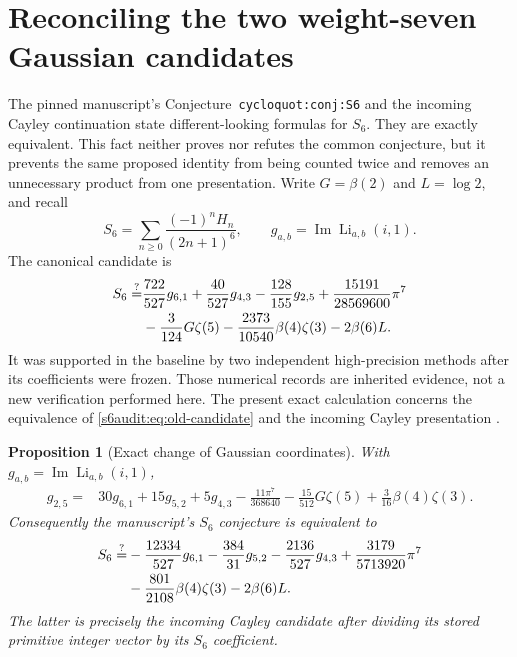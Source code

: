 \documentclass[11pt,a4paper]{article}
\numberwithin{equation}{section}
\theoremstyle{plain}
\newtheorem{proposition}[theorem]{Proposition}
\theoremstyle{definition}
\theoremstyle{remark}
\begin{document}
\section{Reconciling the two weight-seven Gaussian candidates}
\label{s6audit:sec:main}

The pinned manuscript's Conjecture~\texttt{cycloquot:conj:S6} and the
incoming Cayley continuation state different-looking formulas for $S_6$.
They are exactly equivalent. This fact neither proves nor refutes the
common conjecture, but it prevents the same proposed identity from being
counted twice and removes an unnecessary product from one presentation.
Write $G=\beta(2)$ and $L=\log2$, and recall
\[
 S_6=\sum_{n\ge0}\frac{(-1)^nH_n}{(2n+1)^6},
 \qquad g_{a,b}=\operatorname{Im}\operatorname{Li}_{a,b}(i,1).
\]
The canonical candidate is
\begin{align}
 S_6\stackrel{?}{=}&\frac{722}{527}g_{6,1}
 +\frac{40}{527}g_{4,3}-\frac{128}{155}g_{2,5}
 +\frac{15191}{28569600}\pi^7\notag\\
 &-\frac3{124}G\zeta(5)-\frac{2373}{10540}\beta(4)\zeta(3)
 -2\beta(6)L.\label{s6audit:eq:old-candidate}
\end{align}
It was supported in the baseline by two independent high-precision
methods after its coefficients were frozen. Those numerical records
are inherited evidence, not a new verification performed here.
The present exact calculation concerns the equivalence of
\eqref{s6audit:eq:old-candidate} and the incoming Cayley presentation
\cite{cont:CayleyIncoming}.

\begin{proposition}[Exact change of Gaussian coordinates]\label{s6audit:prop:coordinate}
With $g_{a,b}=\operatorname{Im}\operatorname{Li}_{a,b}(i,1)$,
\begin{align}
 g_{2,5}={}&30g_{6,1}+15g_{5,2}+5g_{4,3}
 -\frac{11\pi^7}{368640}
 -\frac{15}{512}G\zeta(5)
 +\frac3{16}\beta(4)\zeta(3).
 \label{s6audit:eq:coordinate}
\end{align}
Consequently the manuscript's $S_6$ conjecture is equivalent to
\begin{align}
 S_6\stackrel{?}{=}&-\frac{12334}{527}g_{6,1}
        -\frac{384}{31}g_{5,2}
        -\frac{2136}{527}g_{4,3}
        +\frac{3179}{5713920}\pi^7\notag\\
       &-\frac{801}{2108}\beta(4)\zeta(3)
        -2\beta(6)L.
 \label{s6audit:eq:reduced-candidate}
\end{align}
The latter is precisely the incoming Cayley candidate after dividing its
stored primitive integer vector by its $S_6$ coefficient.
\end{proposition}
\end{document}
